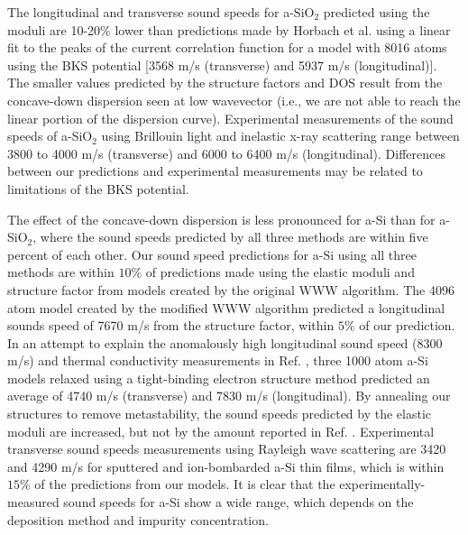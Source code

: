 \documentclass[aps,prb,twocolumn,superscriptaddress,footinbib,amsmath,amssymb,floatfix]{revtex4}
\begin{document}
The longitudinal and transverse sound speeds for 
a-SiO$_2$ predicted using the moduli are 10-20\%  
lower than predictions made by Horbach et al. using a linear fit 
to the peaks of the 
current correlation function for a model with 
8016 atoms using the BKS potential 
[3568 m/s (transverse) and 5937 m/s (longitudinal)].
\cite{horbach_high_2001} The smaller 
values predicted by the structure factors and DOS 
result from the concave-down dispersion seen at low 
wavevector (i.e., we are not able to reach 
the linear portion of the dispersion curve). 
Experimental measurements of the sound speeds of a-SiO$_2$ 
using Brillouin light and inelastic x-ray 
scattering range between 3800 to 4000 m/s (transverse) and 
6000 to 6400 m/s (longitudinal).
\cite{ruocco_high-frequency_2001,polian_elastic_2002,
ruzicka_evidence_2004} Differences between our predictions and 
experimental measurements may be related to limitations of the 
BKS potential.

The effect of the concave-down dispersion
is less pronounced for a-Si than for a-SiO$_2$, where the sound speeds 
predicted by all three methods are within five percent of each other. 
Our sound speed predictions for a-Si using all three methods
are within $10\%$ of predictions made using the elastic moduli
\cite{kluge_elastic_1988,feldman_elastic_1991} 
and structure factor\cite{feldman_calculations_2002} 
from models created by the original WWW algorithm.
\cite{wooten_computer_1985} 
The 4096 atom model created by the modified WWW algorithm 
\cite{barkema_high-quality_2000} predicted a longitudinal sounds 
speed of 7670 m/s from the structure factor,
\cite{christie_vibrational_2007} within $5\%$ of our prediction. 
In an attempt to explain the 
anomalously high longitudinal sound speed (8300 m/s) and 
thermal conductivity measurements in Ref. , 
three 1000 atom a-Si models relaxed using a tight-binding electron 
structure method predicted an average of 4740 m/s (transverse) and 
7830 m/s (longitudinal).\cite{liu_high_2009} By annealing our 
structures to remove metastability, 
the sound speeds predicted by the elastic moduli are increased, but 
not by the amount reported in Ref. . 
Experimental transverse sound speeds measurements using Rayleigh wave 
scattering are 3420 and 4290 m/s for sputtered 
and ion-bombarded a-Si thin films,\cite{vacher_attenuation_1980} which 
is within $15\%$ of the predictions from our models. 
It is clear that the experimentally-measured sound speeds for a-Si 
show a wide range, which depends on the deposition method and impurity 
concentration.
\cite{vacher_attenuation_1980,liu_high_2009,yang_anomalously_2010}
\end{document}
